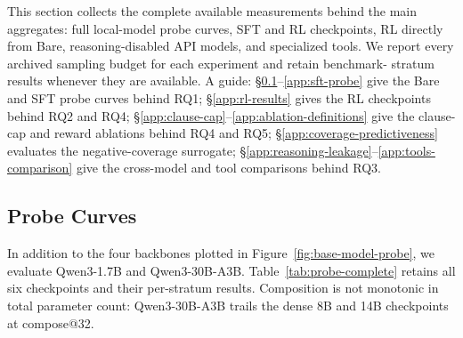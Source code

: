 This section collects the complete available measurements behind the main
aggregates: full local-model probe curves, SFT and RL checkpoints, RL directly
from Bare, reasoning-disabled API models, and specialized tools.  We report
every archived sampling budget for each experiment and retain benchmark-
stratum results whenever they are available.  A guide:
\S\ref{app:probe-curves}--\ref{app:sft-probe} give the Bare and SFT probe
curves behind RQ1; \S\ref{app:rl-results} gives the RL checkpoints behind
RQ2 and RQ4; \S\ref{app:clause-cap}--\ref{app:ablation-definitions} give the
clause-cap and reward ablations behind RQ4 and RQ5;
\S\ref{app:coverage-predictiveness} evaluates the negative-coverage
surrogate; \S\ref{app:reasoning-leakage}--\ref{app:tools-comparison} give
the cross-model and tool comparisons behind RQ3.

\subsection{Probe Curves}
\label{app:probe-curves}

In addition to the four backbones plotted in Figure~\ref{fig:base-model-probe},
we evaluate Qwen3-1.7B and Qwen3-30B-A3B.  Table~\ref{tab:probe-complete}
retains all six checkpoints and their per-stratum results.  Composition is
not monotonic in total parameter count: Qwen3-30B-A3B trails the dense 8B
and 14B checkpoints at compose@32.

